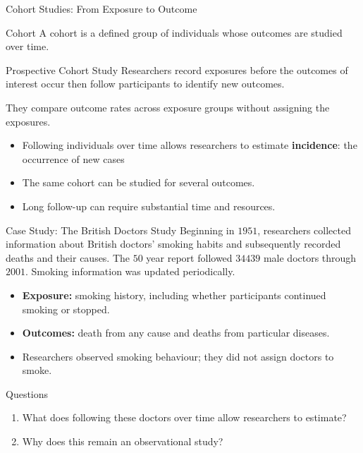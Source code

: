 \documentclass[aspectratio=169]{beamer}
\begin{document}
\begin{frame}{Cohort Studies: From Exposure to Outcome}
\begin{block}{Cohort}
A cohort is a defined group of individuals whose outcomes are studied over time.
\end{block}

\begin{block}{Prospective Cohort Study}
Researchers record exposures before the outcomes of interest occur then follow participants to identify new outcomes.

They compare outcome rates across exposure groups without assigning the exposures.
\end{block}

\begin{itemize}
	\item Following individuals over time allows researchers to estimate \textbf{incidence}: the occurrence of new cases
	\item The same cohort can be studied for several outcomes.
  	\item Long follow-up can require substantial time and resources.
\end{itemize}
\end{frame}

\begin{frame}{Case Study: The British Doctors Study}
Beginning in $1951$, researchers collected information about British doctors' smoking habits and subsequently recorded deaths and their causes. The $50$ year report followed $34439$ male doctors through $2001$. Smoking information was updated periodically.

\begin{itemize}
	\item \textbf{Exposure:} smoking history, including whether participants continued smoking or stopped.
	\item \textbf{Outcomes:} death from any cause and deaths from particular diseases. 
	\item Researchers observed smoking behaviour; they did not assign doctors to smoke.
\end{itemize}

\begin{block}{Questions}
\begin{enumerate}
	\item What does following these doctors over time allow researchers to estimate?
	\item Why does this remain an observational study?
\end{enumerate}
\end{block}
\end{frame}
\end{document}
